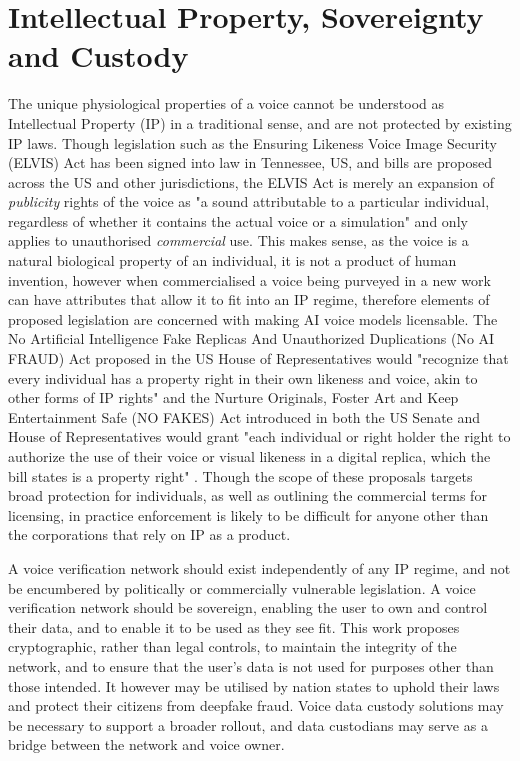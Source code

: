 \documentclass[11pt,a4paper]{article}
\begin{document}
\section{Intellectual Property, Sovereignty and Custody}
\label{sec:conclusion}
The unique physiological properties of a voice cannot be understood as Intellectual Property (IP) in a traditional sense, and are not protected by existing IP laws.
Though legislation such as the Ensuring Likeness Voice Image Security (ELVIS) Act \cite{elvis2024act} has been signed into law in Tennessee, US, and bills are proposed across the US and other jurisdictions, the ELVIS Act is merely an expansion of \textit{publicity} rights of the voice as "a sound attributable to a particular individual, regardless of whether it contains the actual voice or a simulation" and only applies to unauthorised \textit{commercial} use.
This makes sense, as the voice is a natural biological property of an individual, it is not a product of human invention, however when commercialised a voice being purveyed in a new work can have attributes that allow it to fit into an IP regime, therefore elements of proposed legislation are concerned with making AI voice models licensable.
The No Artificial Intelligence Fake Replicas And Unauthorized Duplications (No AI FRAUD) Act \cite{noaifraud2024act} proposed in the US House of Representatives would "recognize that every individual has a property right in their own likeness and voice, akin to other forms of IP rights\cite{ipwatchdog2024noaifraud}" and the Nurture Originals, Foster Art and Keep Entertainment Safe (NO FAKES) Act \cite{nofakes2024act} introduced in both the US Senate and House of Representatives would grant "each individual or right holder the right to authorize the use of their voice or visual likeness in a digital replica, which the bill states is a property right" \cite{ipupdate2024nofakes}.
Though the scope of these proposals targets broad protection for individuals, as well as outlining the commercial terms for licensing, in practice enforcement is likely to be difficult for anyone other than the corporations that rely on IP as a product.

A voice verification network should exist independently of any IP regime, and not be encumbered by politically or commercially vulnerable legislation.
A voice verification network should be sovereign, enabling the user to own and control their data, and to enable it to be used as they see fit.
This work proposes cryptographic, rather than legal controls, to maintain the integrity of the network, and to ensure that the user's data is not used for purposes other than those intended.
It however may be utilised by nation states to uphold their laws and protect their citizens from deepfake fraud.
Voice data custody solutions may be necessary to support a broader rollout, and data custodians may serve as a bridge between the network and voice owner.
\end{document}
